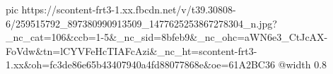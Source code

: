  
 
 
 
 

\ifcmt
  pic https://scontent-frt3-1.xx.fbcdn.net/v/t39.30808-6/259515792_897380990913509_1477625253867278304_n.jpg?_nc_cat=106&ccb=1-5&_nc_sid=8bfeb9&_nc_ohc=aWN6e3_CtJcAX-FoVdw&tn=lCYVFeHcTIAFcAzi&_nc_ht=scontent-frt3-1.xx&oh=fc3de86e65b43407940a4fd88077868e&oe=61A2BC36
  @width 0.8
\fi
